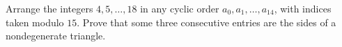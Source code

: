 Arrange the integers $4,5,\ldots,18$ in any cyclic order $a_0,a_1,\ldots,a_{14}$, with indices taken modulo $15$. Prove that some three consecutive entries are the sides of a nondegenerate triangle.
